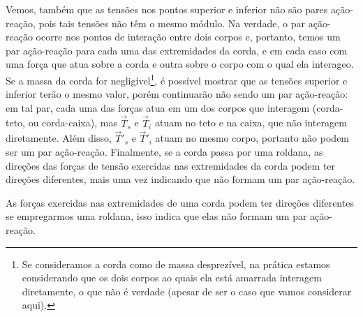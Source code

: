 Vemos, também que as tensões nos pontos superior e inferior não são pares ação-reação, pois tais tensões não têm o mesmo módulo. Na verdade, o par ação-reação ocorre nos pontos de interação entre dois corpos e, portanto, temos um par ação-reação para cada uma das extremidades da corda, e em cada caso com uma força que atua sobre a corda e outra sobre o corpo com o qual ela interageo. Se a massa da corda for negligível\footnote[][-5mm]{Se consideramos a corda como de massa desprezível, na prática estamos considerando que os dois corpos ao quais ela está amarrada interagem diretamente, o que não é verdade (apesar de ser o caso que vamos considerar aqui).}, é possível mostrar que as tensões superior e inferior terão o mesmo valor, porém continuarão não sendo um par ação-reação: em tal par, cada uma das forças atua em um dos corpos que interagem (corda-teto, ou corda-caixa), mas $\vec{T}_s$ e $\vec{T}_i$ atuam no teto e na caixa, que não interagem diretamente. Além disso, $\vec{T}'_s$ e $\vec{T}'_i$ atuam no mesmo corpo, portanto não podem ser um par ação-reação. Finalmente, se a corda passa por uma roldana, as direções das forças de tensão exercidas nas extremidades da corda podem ter direções diferentes, mais uma vez indicando que não formam um par ação-reação.
\begin{marginfigure}
\caption{As forças exercidas nas extremidades de uma corda podem ter direções diferentes se empregarmos uma roldana, isso indica que elas não formam um par ação-reação.}
\end{marginfigure}


